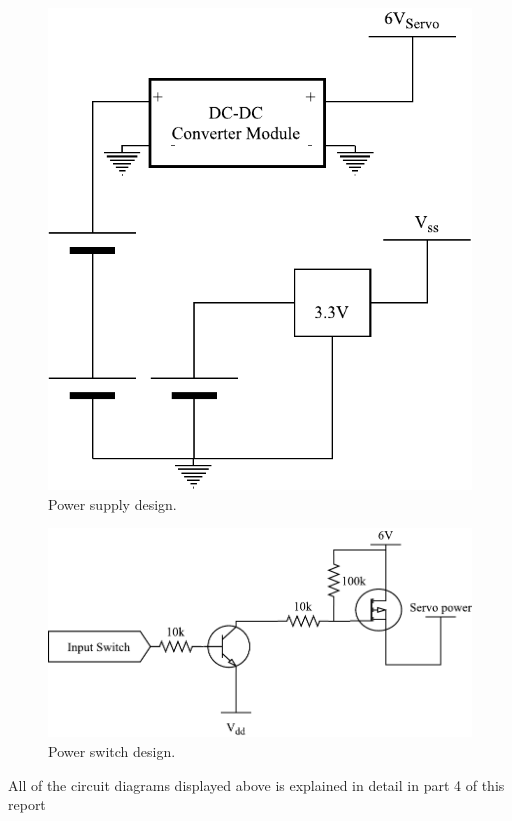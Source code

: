 \begin{figure}[H]
\centering
\includegraphics[scale = 1]{pics/PowerSupply.pdf}
\caption{Power supply design.}
\end{figure}
\begin{figure}[H]
\centering
\includegraphics[scale = 1]{pics/PowerSwitch.pdf}
\caption{Power switch design.}
\end{figure}
All of the circuit diagrams displayed above is explained in detail in part 4 of this report\\

